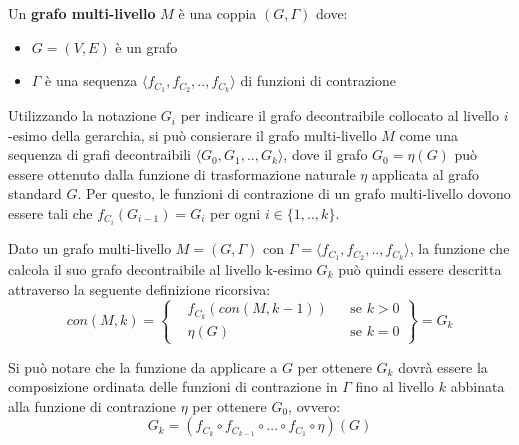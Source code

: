     \begin{defintion} \newline
    Un \textbf{grafo multi-livello} $M$ \`e una coppia $(G, \Gamma)$ dove:
        \begin{itemize}
            \item $G = (V, E)$ \`e un grafo
            \item $\Gamma$ \`e una sequenza $\langle f_{C_1}, f_{C_2}, .., f_{C_k} \rangle$ di funzioni di contrazione
        \end{itemize}
    \end{defintion}

    Utilizzando la notazione $G_i$ per indicare il grafo decontraibile collocato al livello $i$-esimo della gerarchia,
    si pu\`o consierare il grafo multi-livello $M$ come una sequenza di grafi decontraibili
    $\langle G_0, G_1, .., G_k \rangle$, dove il grafo $G_0 = \eta(G)$ pu\`o essere ottenuto dalla funzione di
    trasformazione naturale $\eta$ applicata al grafo standard $G$.
    Per questo, le funzioni di contrazione di un grafo multi-livello dovono essere tali che
    $f_{C_i}(G_{i-1}) = G_i$ per ogni $i \in \{1, .., k\}$. \newline

    Dato un grafo multi-livello $M = (G,\Gamma)$ con $\Gamma = \langle f_{C_1}, f_{C_2}, .., f_{C_k} \rangle$,
    la funzione che calcola il suo grafo decontraibile al livello k-esimo $G_k$ pu\`o quindi essere descritta
    attraverso la seguente definizione ricorsiva: \newline
    \begin{equation*}
        con(M, k) =
        \left\{
        \begin{aligned}
            &f_{C_k}(con(M, k-1)) && \text{se } k > 0\\
            &\eta(G)  && \text{se } k = 0
        \end{aligned}
        \right\}
        = G_k
    \end{equation*} \newline

    Si pu\`o notare che la funzione da applicare a $G$ per ottenere $G_{k}$ dovr\`a essere la composizione ordinata
    delle funzioni di contrazione in $\Gamma$ fino al livello $k$ abbinata alla funzione di contrazione $\eta$ per
    ottenere $G_0$, ovvero:
    \begin{equation*}
        G_k = (f_{C_k} \circ f_{C_{k-1}} \circ \ldots \circ f_{C_1} \circ \eta)(G)
    \end{equation*}

